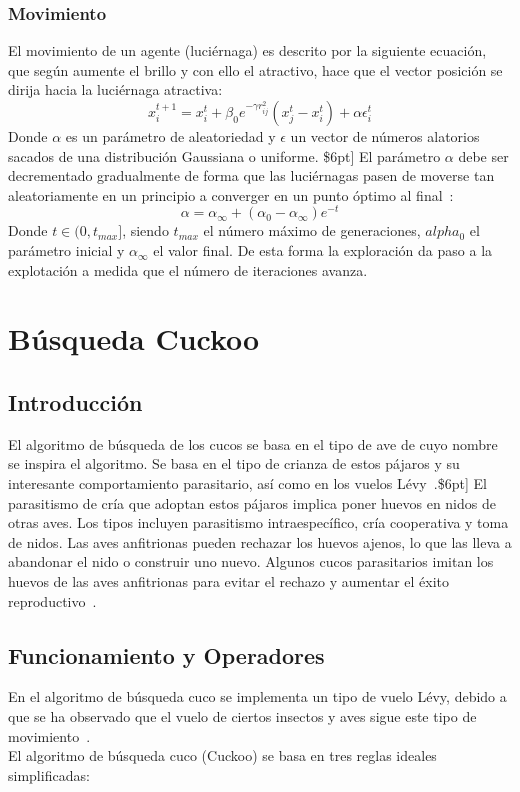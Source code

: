 \subsubsection{Movimiento}
El movimiento de un agente (luciérnaga) es descrito por la siguiente ecuación, que según aumente el brillo y con ello el atractivo, hace que el vector posición se dirija hacia la luciérnaga atractiva:
\begin{equation}
    x_i^{t+1} = x_i^t + \beta_0e^{-\gamma r_{ij}^2}(x_j^t-x_i^t)+\alpha\epsilon_i^t
\end{equation}
Donde $\alpha$ es un parámetro de aleatoriedad y $\epsilon$ un vector de números alatorios sacados de una distribución Gaussiana o uniforme. \$6pt]
El parámetro $\alpha$ debe ser decrementado gradualmente de forma que las luciérnagas pasen de moverse tan aleatoriamente en un principio a converger en un punto óptimo al final~\cite{yang_chapter_2014}:
\begin{equation}
    \alpha = \alpha_\infty + (\alpha_0-\alpha_\infty)e^{-t}
\end{equation}
Donde $t\in(0,t_{max}]$, siendo $t_{max}$ el número máximo de generaciones, $alpha_0$ el parámetro inicial y $\alpha_\infty$ el valor final. De esta forma la exploración da paso a la explotación a medida que el número de iteraciones avanza.

\section{Búsqueda Cuckoo}
\subsection{Introducción}
El algoritmo de búsqueda de los cucos se basa en el tipo de ave de cuyo nombre se inspira el algoritmo. Se basa en el tipo de crianza de estos pájaros y su interesante comportamiento parasitario, así como en los vuelos Lévy~\cite{noauthor_levy_nodate}.\$6pt]
El parasitismo de cría que adoptan estos pájaros implica poner huevos en nidos de otras aves. Los tipos incluyen parasitismo intraespecífico, cría cooperativa y toma de nidos. Las aves anfitrionas pueden rechazar los huevos ajenos, lo que las lleva a abandonar el nido o construir uno nuevo. Algunos cucos parasitarios imitan los huevos de las aves anfitrionas para evitar el rechazo y aumentar el éxito reproductivo~\cite{yang_cuckoo_2010}.
\subsection{Funcionamiento y Operadores}
En el algoritmo de búsqueda cuco se implementa un tipo de vuelo Lévy, debido a que se ha observado que el vuelo de ciertos insectos y aves sigue este tipo de movimiento~\cite{yang_cuckoo_2010}.\\[6pt]
El algoritmo de búsqueda cuco (Cuckoo) se basa en tres reglas ideales simplificadas:

